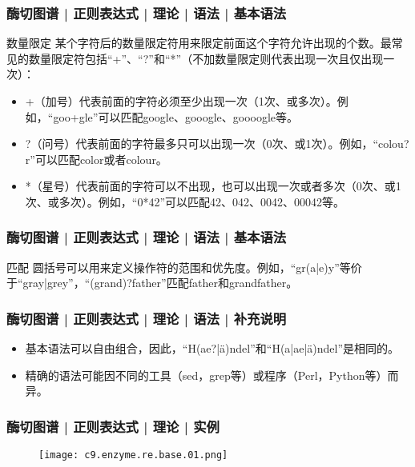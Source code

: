 \begin{frame}
  \frametitle{酶切图谱 | 正则表达式 | 理论 | 语法 | \alert{基本语法}}
  \begin{block}{数量限定}
        某个字符后的数量限定符用来限定前面这个字符允许出现的个数。最常见的数量限定符包括“+”、“?”和“*”（不加数量限定则代表出现一次且仅出现一次）： 
	\begin{itemize}
	  \item +（加号）代表前面的字符必须至少出现一次（1次、或多次）。例如，“goo+gle”可以匹配google、gooogle、goooogle等。
	  \item ?（问号）代表前面的字符最多只可以出现一次（0次、或1次）。例如，“colou?r”可以匹配color或者colour。
	  \item *（星号）代表前面的字符可以不出现，也可以出现一次或者多次（0次、或1次、或多次）。例如，“0*42”可以匹配42、042、0042、00042等。 
	\end{itemize}
  \end{block}
\end{frame}

\begin{frame}
  \frametitle{酶切图谱 | 正则表达式 | 理论 | 语法 | \alert{基本语法}}
  \begin{block}{匹配}
    圆括号可以用来定义操作符的范围和优先度。例如，“gr(a|e)y”等价于“gray|grey”，“(grand)?father”匹配father和grandfather。
  \end{block}
\end{frame}

\begin{frame}
  \frametitle{酶切图谱 | 正则表达式 | 理论 | 语法 | 补充说明}
  \begin{itemize}
    \item 基本语法可以自由组合，因此，“H(ae?|ä)ndel”和“H(a|ae|ä)ndel”是相同的。
    \item 精确的语法可能因不同的工具（sed，grep等）或程序（Perl，Python等）而异。
  \end{itemize}
\end{frame}

\begin{frame}
  \frametitle{酶切图谱 | 正则表达式 | 理论 | 实例}
  \begin{figure}
    \centering
    \texttt{[image: c9.enzyme.re.base.01.png]}
  \end{figure}
\end{frame}

